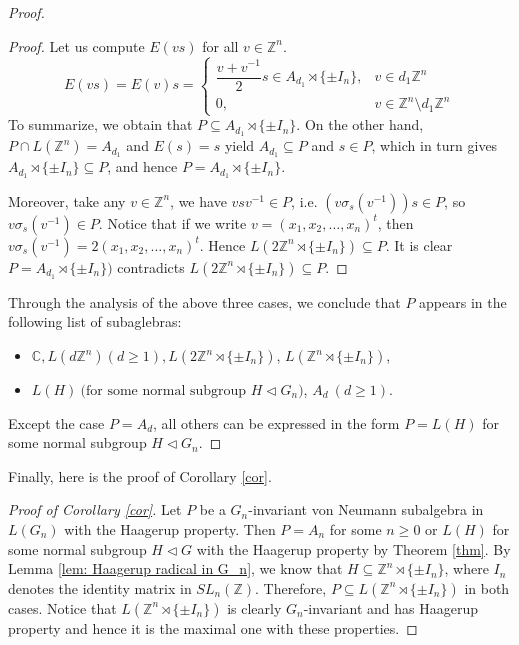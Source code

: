 \documentclass[12pt]{amsart}
\theoremstyle{definition}
\theoremstyle{remark}
\begin{document}
\begin{proof}
\begin{proof}
Let us compute $E(vs)$ for all $v\in \mathbb{Z}^n$. 
\begin{equation*}
E(vs)=E(v)s=\begin{cases} 
\dfrac{v+v^{-1}}{2}s\in A_{d_{1}} \rtimes \{\pm I_{n}\}, & v \in d_1\mathbb{Z}^n \\
0, & v \in \mathbb{Z}^n \setminus d_1\mathbb{Z}^n
\end{cases}
\end{equation*}
To summarize, we obtain that $P\subseteq A_{d_{1}}\rtimes\{\pm I_{n}
\}$. On the other hand, $P\cap L(\mathbb{Z}^n)=A_{d_{1}}$ and $E(s)=s$ yield $A_{d_{1}} \subseteq P$ and $s\in P$, which in turn gives $A_{d_{1}}\rtimes\{\pm I_{n}\}\subseteq P$, and hence  
$P = A_{d_{1}}\rtimes\{\pm I_{n}\}$.

Moreover, take any $v\in\mathbb{Z}^n$, we have $vsv^{-1}\in P$, i.e. $(v\sigma_s(v^{-1}))s\in P$, so $v\sigma_s(v^{-1})\in P$. Notice that if we write $v=(x_{1},x_{2},\dots,x_{n} )^t$, then $v\sigma_s(v^{-1})=2(x_1,x_2,\dots,x_n)^t$. Hence $L(2\mathbb{Z}^n\rtimes \{\pm I_{n}\})\subseteq P$. It is clear $P = A_{d_{1}}\rtimes\{\pm I_{n}\})$ contradicts $L(2\mathbb{Z}^n\rtimes \{\pm I_{n}\})\subseteq P$.
\end{proof}


Through the analysis of the  above three cases, we conclude that $P$ appears in the following list of subaglebras: 
\begin{itemize}
\item $\mathbb{C}, L(d\mathbb{Z}^n)(d\ge 1), L(2\mathbb{Z}^n \rtimes \{\pm I_{n}\})$, $L(\mathbb{Z}^n \rtimes \{\pm I_{n}\})$,
\item $L(H) ~\text{(for some normal subgroup $H\lhd G_{n}$)}$,
$A_{d} ~(d\ge1)$.
\end{itemize}


Except the case $P = A_{d}$, all others can be expressed in the form $P=L(H)$ for some normal subgroup $H\lhd G_{n}$. 
\end{proof}

Finally, here is the proof of Corollary \ref{cor}.

\begin{proof}[Proof of Corollary \ref{cor}]
    Let $P$ be a $G_n$-invariant von Neumann subalgebra in $L(G_n)$ with the Haagerup property. Then $P=A_n$ for some $n\geq 0$ or $L(H)$ for some normal subgroup $H\lhd G$ with the Haagerup property by Theorem \ref{thm}. By Lemma \ref{lem: Haagerup radical in G_n}, we know that $H\subseteq \mathbb{Z}^n\rtimes \{\pm I_n\}$, where $I_n$ denotes the identity matrix in $SL_n(\mathbb{Z})$. Therefore, $P\subseteq L(\mathbb{Z}^n\rtimes \{\pm I_n\})$ in both cases.
Notice that $L(\mathbb{Z}^n\rtimes \{\pm I_n\})$ is clearly $G_n$-invariant and has Haagerup property and hence it is the maximal one with these properties.
\end{proof}
\end{document}
